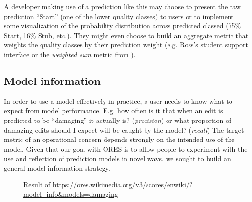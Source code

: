 A developer making use of a prediction like this may choose to present the raw prediction ``Start'' (one of the lower quality classes) to users or to implement some visualization of the probability distribution across predicted classed (75\% Start, 16\% Stub, etc.).  They might even choose to build an aggregate metric that weights the quality classes by their prediction weight (e.g. Ross's student support interface\cite{ross2016visualizing} or the \emph{weighted sum} metric from \cite{halfaker2017interpolating}).

\subsection{Model information}
In order to use a model effectively in practice, a user needs to know what to expect from model performance.  E.g. how often is it that when an edit is predicted to be ``damaging'' it actually is? (\emph{precision}) or what proportion of damaging edits should I expect will be caught by the model? (\emph{recall})  The target metric of an operational concern depends strongly on the intended use of the model.  Given that our goal with ORES is to allow people to experiment with the use and reflection of prediction models in novel ways, we sought to build an general model information strategy.

\begin{figure}[htbp]
        \caption{Result of \url{https://ores.wikimedia.org/v3/scores/enwiki/?model\_info\&models=damaging}}
        \label{fig:english_damaging_model_info}
\end{figure}

